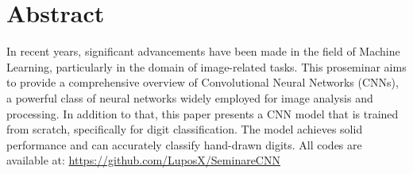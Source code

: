 \section*{Abstract}
In recent years, significant advancements have been made in the field of Machine Learning, particularly in the domain of image-related tasks.
This proseminar aims to provide a comprehensive overview of Convolutional Neural Networks (CNNs), a powerful class of neural networks widely employed for image analysis and processing.
In addition to that, this paper presents a CNN model that is trained from scratch, specifically for digit classification. The model achieves solid performance and can accurately classify hand-drawn digits.
All codes are available at: 
\url{https://github.com/LuposX/SeminareCNN}